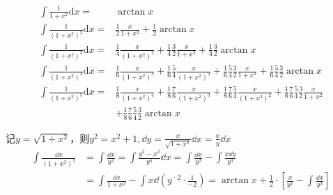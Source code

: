 \begin{theorem}[平方和分母型]
    \vspace{-15pt}
    \begin{align*}
        \int\frac{1}{1+x^2}\mathrm{d}x=&\arctan x\\
        \int\frac{1}{\left(1+x^2\right)^2}\mathrm{d}x=&\frac{1}{2}\frac{x}{1+x^2}+\frac{1}{2}\arctan x\\
        \int\frac{1}{\left(1+x^2\right)^3}\mathrm{d}x=&\frac{1}{4}\frac{x}{\left(1+x^2\right)^2}+\frac{1}{4}\frac{3}{2}\frac{x}{1+x^2}+\frac{1}{4}\frac{3}{2}\arctan x\\
        \int\frac{1}{\left(1+x^{2}\right)^{4}}\mathrm{d}x=&\frac{1}{6}\frac{x}{\left(1+x^{2}\right)^{3}}+\frac{1}{6}\frac{5}{4}\frac{x}{\left(1+x^{2}\right)^{2}}+\frac{1}{6}\frac{5}{4}\frac{3}{2}\frac{x}{1+x^{2}}+\frac{1}{6}\frac{5}{4}\frac{3}{2}\arctan x\\
        \int\frac{1}{\left(1+x^{2}\right)^{5}}\mathrm{d}x=&\frac{1}{8}\frac{x}{\left(1+x^{2}\right)^{4}}+\frac{1}{8}\frac{7}{6}\frac{x}{\left(1+x^{2}\right)^{3}}+\frac{1}{8}\frac{7}{6}\frac{5}{4}\frac{x}{\left(1+x^{2}\right)^{2}}+\frac{1}{8}\frac{7}{6}\frac{5}{4}\frac{3}{2}\frac{x}{1+x^{2}}\\
        &+\frac{1}{8}\frac{7}{6}\frac{5}{4}\frac{3}{2}\arctan x
    \end{align*}
\end{theorem}
记$y=\sqrt{1+x^{2}}$，则$y^2=x^2+1,\dd y=\frac{x}{\sqrt{1+x^2}}\dd x=\frac{x}{y}\dd x$
\begin{align*}
\int\frac{\dd x}{(1+x^{2})^{2}}&=\int\frac{\dd x}{y^{4}}=\int\frac{y^{2}-x^{2}}{y^{4}}\dd x=\int\frac{\dd x}{y^{2}}-\int\frac{x\dd y}{y^{3}}\\&=\int\frac{\dd x}{1+x^{2}}-\int x\dd\left(y^{-2}\cdot\frac{1}{-2}\right)=\arctan x+\frac{1}{2}\cdot\left[\frac{x}{y^{2}}-\int\frac{\dd x}{y^{2}}\right]
\end{align*}

